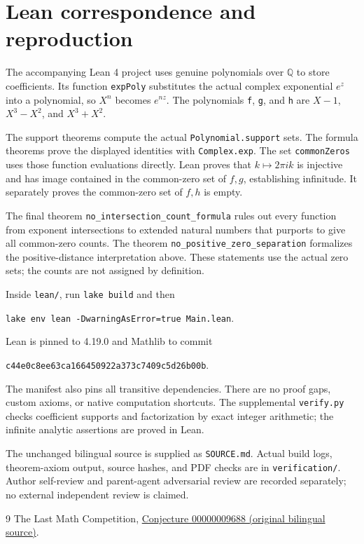 \documentclass[11pt]{article}
\begin{document}
\section*{Lean correspondence and reproduction}
The accompanying Lean 4 project uses genuine polynomials over $\mathbb Q$ to store coefficients. Its function \texttt{expPoly} substitutes the actual complex exponential $e^z$ into a polynomial, so $X^n$ becomes $e^{nz}$. The polynomials \texttt{f}, \texttt{g}, and \texttt{h} are $X-1$, $X^3-X^2$, and $X^3+X^2$.

The support theorems compute the actual \texttt{Polynomial.support} sets. The formula theorems prove the displayed identities with \texttt{Complex.exp}. The set \texttt{commonZeros} uses those function evaluations directly. Lean proves that $k\mapsto2\pi i k$ is injective and has image contained in the common-zero set of $f,g$, establishing infinitude. It separately proves the common-zero set of $f,h$ is empty.

The final theorem \texttt{no\_intersection\_count\_formula} rules out every function from exponent intersections to extended natural numbers that purports to give all common-zero counts. The theorem \texttt{no\_positive\_zero\_separation} formalizes the positive-distance interpretation above. These statements use the actual zero sets; the counts are not assigned by definition.

Inside \texttt{lean/}, run \texttt{lake build} and then
\begin{center}\texttt{lake env lean -DwarningAsError=true Main.lean}.\end{center}
Lean is pinned to 4.19.0 and Mathlib to commit
\begin{center}\small\texttt{c44e0c8ee63ca166450922a373c7409c5d26b00b}.\end{center}
The manifest also pins all transitive dependencies. There are no proof gaps, custom axioms, or native computation shortcuts. The supplemental \texttt{verify.py} checks coefficient supports and factorization by exact integer arithmetic; the infinite analytic assertions are proved in Lean.

The unchanged bilingual source is supplied as \texttt{SOURCE.md}. Actual build logs, theorem-axiom output, source hashes, and PDF checks are in \texttt{verification/}. Author self-review and parent-agent adversarial review are recorded separately; no external independent review is claimed.

\begin{thebibliography}{9}
 The Last Math Competition,
\href{https://github.com/The-Last-Math-Competition/The-Last-Math-Competition/blob/main/conjectures/00000009688.md}{Conjecture 00000009688 (original bilingual source)}.
\end{thebibliography}
\end{document}
